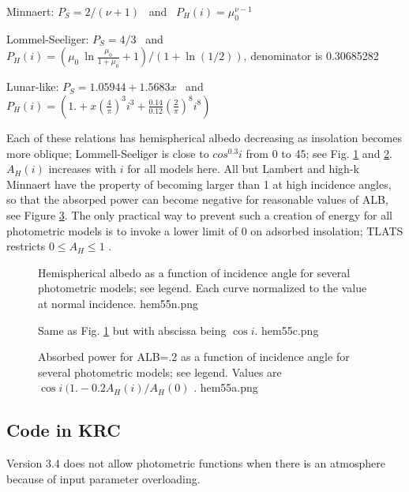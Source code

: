 Minnaert:  $P_S = 2 / (\nu+1) $ \ and \ $ P_H(i)= \mu_0^{\nu-1} $
 
Lommel-Seeliger:  $P_S =4/3 $ \ and \ $ P_H(i)=  \left(\mu_0 \ \ln \frac{\mu_0}{ 1+ \mu_0} +1 \right) / (1+ \ln (1/2)) $, denominator is  0.30685282

Lunar-like: $P_S =1.05944 + 1.5683 x  $ \ and \ $ P_H(i)= \left( 1. + x (\frac{4}{\pi})^3 i^3
+   \frac{0.14}{0.12}( \frac{2}{\pi})^8  i^8 \right) $

\normalsize

Each of these relations has hemispherical albedo decreasing as insolation
becomes more oblique; Lommell-Seeliger is close to $cos^{0.3} i$ from 0 to
45\qd; see Fig. \ref{hem55n} and \ref{hem55c}. $A_H(i)$ increases with $i$ for
all models here. All but Lambert and high-k Minnaert have the property of
becoming larger than 1 at high incidence angles, so that the absorped power can
become negative for reasonable values of ALB, see Figure \ref{hem55a}. The only
practical way to prevent such a creation of energy for all photometric models is
to invoke a lower limit of 0 on adsorbed insolation; TLATS restricts $0 \le A_H \le 1$ .

\begin{figure}[!ht] 
\caption[Normalized Hemispherical Albedo]{Hemispherical albedo as a function of incidence 
angle for several photometric models; see legend. Each curve normalized to the 
value at normal incidence. %
\label{hem55n} hem55n.png }
\end{figure} 
\begin{figure}[!ht] 
\caption[Hemispherical Albedo]{Same as Fig. \ref{hem55n} but with abscissa being $\cos i$. 
\label{hem55c} hem55c.png }
\end{figure} 

\begin{figure}[!ht] 
\caption[Absorbed power]{Absorbed power for ALB=.2 as a function of incidence
 angle for several photometric models; see legend. 
Values are $\cos i \ (1.-0.2 A_H(i)/A_H(0)$ .
\label{hem55a}  hem55a.png }
\end{figure} 

\subsection{Code in KRC} %
Version 3.4 does not allow photometric functions when there is an atmosphere
because of input parameter overloading.

